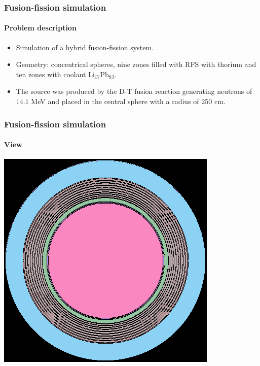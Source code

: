 \documentclass[svgnames,smaller,table]{beamer}
\begin{document}
\begin{frame}
  \frametitle{Fusion-fission simulation}
  \framesubtitle{Problem description}
  \begin{itemize}
  \item Simulation of a hybrid fusion-fission system.
  \item Geometry: concentrical spheres, nine zones filled with RFS with thorium and ten zones with coolant Li$_{17}$Pb$_{83}$.
  \item The source was produced by the D-T fusion reaction generating neutrons of $14.1$ MeV and placed in the central sphere with a radius of 250 cm.
  \end{itemize}
\end{frame}

\begin{frame}
  \frametitle{Fusion-fission simulation}
  \framesubtitle{}

  \framesubtitle{View}
  \begin{center}
    \includegraphics[scale=0.4]{figuras/fusion.png}
  \end{center}
\end{frame}
\end{document}
